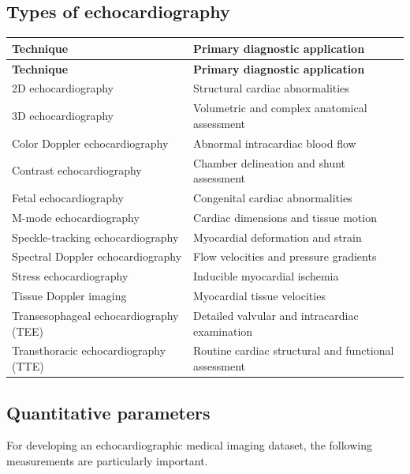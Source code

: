 \subsection{Types of echocardiography}
\begin{longtable}{@{}p{}p{}@{}}
\toprule
\textbf{Technique} & \textbf{Primary diagnostic application} \\
\midrule
\endfirsthead
\toprule
\textbf{Technique} & \textbf{Primary diagnostic application} \\
\midrule
\endhead
2D echocardiography & Structural cardiac abnormalities \\
3D echocardiography & Volumetric and complex anatomical assessment \\
Color Doppler echocardiography & Abnormal intracardiac blood flow \\
Contrast echocardiography & Chamber delineation and shunt assessment \\
Fetal echocardiography & Congenital cardiac abnormalities \\
M-mode echocardiography & Cardiac dimensions and tissue motion \\
Speckle-tracking echocardiography & Myocardial deformation and strain \\
Spectral Doppler echocardiography & Flow velocities and pressure gradients \\
Stress echocardiography & Inducible myocardial ischemia \\
Tissue Doppler imaging & Myocardial tissue velocities \\
Transesophageal echocardiography (TEE) & Detailed valvular and intracardiac examination \\
Transthoracic echocardiography (TTE) & Routine cardiac structural and functional assessment \\
\bottomrule
\end{longtable}

\subsection{Quantitative parameters}
For developing an echocardiographic medical imaging dataset, the following measurements are particularly important.

